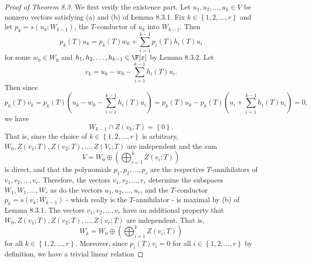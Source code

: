 \documentclass[linearalgebra]{subfiles}
\begin{document}
    \begin{proof}[Proof of Theorem 8.3]
        We first verify the existence part. Let $u_1,u_2,\ldots,u_k\in V$ be nonzero vectors satisfying (a) and (b) of Lemma 8.3.1. Fix $k\in\left\lbrace 1,2,\ldots,r \right\rbrace $ and let $p_k=s\left( u_k;W_{k-1} \right) $, the $T$-conductor of $u_k$ into $W_{k-1}$. Then
        \begin{equation*}
            p_k(T)u_k = p_k(T)w_0 + \sum^{k-1}_{i=1} p_i(T)h_i(T)u_i
        \end{equation*}
        for some $w_0\in W_0$ and $h_1,h_2,\ldots,h_{k-1}\in\F[x]$ by Lemma 8.3.2. Let
        \begin{equation*}
            v_k = u_k - w_0 - \sum^{k-1}_{i=1} h_i(T)u_i.
        \end{equation*}
        Then since
        \begin{equation*}
            p_k(T)v_k = p_k(T)\left( u_k-w_0-\sum^{k-1}_{i=1} h_i(T)u_i \right) = p_k(T)u_k - p_k(T)\left( u_i+\sum^{k-1}_{i=1} h_i(T)u_i \right) = 0,
        \end{equation*}
        we have
        \begin{equation*}
            W_{k-1}\cap Z(v_k;T) = \left\lbrace 0 \right\rbrace .
        \end{equation*}
        That is, since the choice of $k\in\left\lbrace 1,2,\ldots,r \right\rbrace$ is arbitrary, $W_0, Z(v_1;T), Z(v_2;T), \ldots, Z(V_r;T)$ are independent and the sum
        \begin{equation*}
            V = W_0 \oplus \left( \bigoplus^{k}_{i=1} Z\left( v_i;T \right)  \right) 
        \end{equation*}
        is direct, and that the polynomials $p_1,p_2,\ldots,p_r$ are the respective $T$-annihilators of $v_1,v_2,\ldots,v_r$. Therefore, the vectors $v_1,v_2,\ldots,r_r$ determine the subspaces $W_1,W_1,\ldots,W_r$ as do the vectors $u_1,u_2,\ldots,u_r$, and the $T$-conductor $p_k = s\left( v_k;W_{k-1} \right)$ - which really is the $T$-annihilator - is maximal by (b) of Lemma 8.3.1. The vectors $v_1,v_2,\ldots,v_r$ have an additional property that $W_0,Z\left( v_1;T \right) ,Z\left( v_2;T \right), \ldots, Z\left( v_r;T \right) $ are independent. That is,
        \begin{equation*}
            W_k = W_0 \oplus \left( \bigoplus^{k}_{i=1} Z\left( v_i;T \right)  \right) 
        \end{equation*}
        for all $k\in \left\lbrace 1,2,\ldots,r \right\rbrace$. Moreover, since $p_i(T)v_i = 0$ for all $i\in \left\lbrace 1,2,\ldots,r \right\rbrace$ by definition, we have a trivial linear relation

\end{proof}
\end{document}
